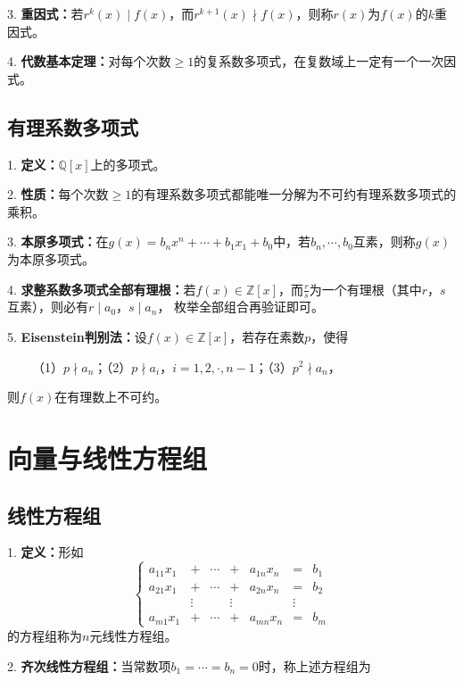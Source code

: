 3. \textbf{重因式：}若$r^k(x)\mid f(x)$，而$r^{k+1}(x)\nmid f(x)$，则称$r(x)$为$f(x)$的$k$重因式。

4. \textbf{代数基本定理：}对每个次数$\geqslant 1$的复系数多项式，在复数域上一定有一个一次因式。

\subsection{有理系数多项式}

1. \textbf{定义：}$\mathbb{Q}[x]$上的多项式。

2. \textbf{性质：}每个次数$\geqslant 1$的有理系数多项式都能唯一分解为不可约有理系数多项式的乘积。

3. \textbf{本原多项式：}在$g(x)=b_nx^n+\cdots+b_1x_1+b_0$中，若$b_n,\cdots,b_0$互素，则称$g(x)$为本原多项式。

4. \textbf{求整系数多项式全部有理根：}若$f(x)\in \mathbb{Z}[x]$，而$\frac{r}{s}$为一个有理根（其中$r$，$s$互素），则必有$r\mid a_0$，$s\mid a_n$，
枚举全部组合再验证即可。

5. \textbf{Eisenstein判别法：}设$f(x)\in \mathbb{Z}[x]$，若存在素数$p$，使得

~~~~（1）$p \nmid a_n$；（2）$p\nmid a_i$，$i=1,2,\cdot,n-1$；（3）$p^2\nmid a_n$，

则$f(x)$在有理数上不可约。

\section{向量与线性方程组}

\subsection{线性方程组}

1. \textbf{定义：}形如
\begin{equation*}
    \left\{\begin{aligned}
        a_{11}x_1&+&\cdots&+&a_{1n}x_n&=&b_1\\
        a_{21}x_1&+&\cdots&+&a_{2n}x_n&=&b_2\\
        &\vdots&&\vdots&&\vdots&\\
        a_{m1}x_1&+&\cdots&+&a_{mn}x_n&=&b_m
    \end{aligned}\right.
\end{equation*}
的方程组称为$n$元线性方程组。

2. \textbf{齐次线性方程组：}当常数项$b_1=\cdots=b_n=0$时，称上述方程组为


